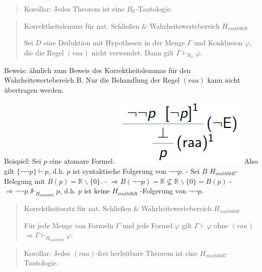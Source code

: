 \documentclass[a4paper]{article}
\begin{document}
\begin{multicols}{3}
  \begin{quote}
    Korollar: Jedes Theorem ist eine $B_\mathbb{R}$-Tautologie.
  \end{quote}

  \begin{quote}
    Korrektheitslemma für nat. Schließen \& Wahrheitswertebereich
    $H_{mathbb{R}}$

    Sei $D$ eine Deduktion mit Hypothesen in der Menge $\Gamma$ und
    Konklusion $\varphi$, die die Regel $(raa)$ nicht verwendet. Dann gilt
    $\Gamma\vdash_{H_\mathbb{R}}\varphi$.
  \end{quote}

  Beweis: ähnlich zum Beweis des Korrektheitslemmas für den
  Wahrheitswertebereich B. Nur die Behandlung der Regel $(raa)$ kann nicht
  übertragen werden.

  Beispiel: Sei $p$ eine atomare Formel.
  \includegraphics[width=\linewidth]{Assets/Logik-beispiel-7.png} Also gilt
  $\{\lnot\lnot p\}\vdash p$, d.h. $p$ ist syntaktische Folgerung von
  $\lnot\lnot p$. - Sei $B$ $H_{mathbb{R}}$-Belegung mit
  $B(p)=\mathbb{R}\backslash\{0\}$. -
  $\Rightarrow B(\lnot\lnot p) =\mathbb{R}\not\subseteq \mathbb{R}\backslash\{0\}=B(p)$
  - $\Rightarrow\lnot\lnot p\not\Vdash_{H_{mathbb{R}}} p$, d.h. $p$ ist
  keine $H_{mathbb{R}}$ -Folgerung von $\lnot\lnot p$.

  \begin{quote}
    Korrektheitssatz für nat. Schließen \& Wahrheitswertebereich
    $H_{mathbb{R}}$

    Für jede Menge von Formeln $\Gamma$ und jede Formel $\varphi$ gilt
    $\Gamma\vdash\varphi$ ohne $(raa)$
    $\Rightarrow\Gamma\vdash_{H_{mathbb{R}}}\varphi$.
  \end{quote}

  \begin{quote}
    Korollar: Jedes $(raa)$-frei herleitbare Theorem ist eine
    $H_{mathbb{R}}$-Tautologie.
  \end{quote}


\end{multicols}
\end{document}
